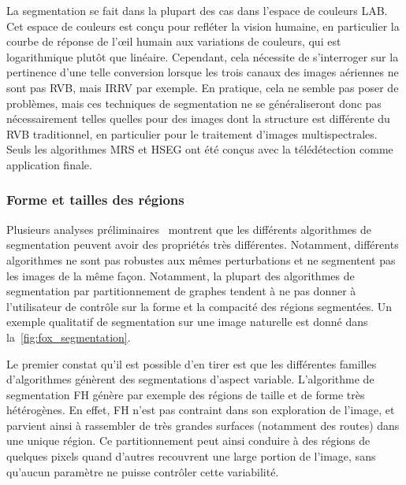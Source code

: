 La segmentation se fait dans la plupart des cas dans l'espace de couleurs \gls{LAB}. Cet espace de couleurs est conçu pour refléter la vision humaine, en particulier la courbe de réponse de l'\oe{}il humain aux variations de couleurs, qui est logarithmique plutôt que linéaire. Cependant, cela nécessite de s'interroger sur la pertinence d'une telle conversion lorsque les trois canaux des images aériennes ne sont pas \gls{RVB}, mais \gls{IRRV} par exemple. En pratique, cela ne semble pas poser de problèmes, mais ces techniques de segmentation ne se généraliseront donc pas nécessairement telles quelles pour des images dont la structure est différente du \gls{RVB} traditionnel, en particulier pour le traitement d'images multispectrales. Seuls les algorithmes \gls{MRS} et \gls{HSEG} ont été conçus avec la télédétection comme application finale.

\subsubsection{Forme et tailles des régions}

Plusieurs analyses préliminaires~\cite{neubert_superpixel_2012,achanta_slic_2012,stutz_superpixels_2018} montrent que les différents algorithmes de segmentation peuvent avoir des propriétés très différentes. Notamment, différents algorithmes ne sont pas robustes aux mêmes perturbations et ne segmentent pas les images de la même façon. Notamment, la plupart des algorithmes de segmentation par partitionnement de graphes tendent à ne pas donner à l'utilisateur de contrôle sur la forme et la compacité des régions segmentées. Un exemple qualitatif de segmentation sur une image naturelle est donné dans la~\cref{fig:fox_segmentation}.

Le premier constat qu'il est possible d'en tirer est que les différentes familles d'algorithmes génèrent des segmentations d'aspect variable. L'algorithme de segmentation \gls{FH} génère par exemple des régions de taille et de forme très hétérogènes. En effet, \gls{FH} n'est pas contraint dans son exploration de l'image, et parvient ainsi à rassembler de très grandes surfaces (notamment des routes) dans une unique région. Ce partitionnement peut ainsi conduire à des régions de quelques pixels quand d'autres recouvrent une large portion de l'image, sans qu'aucun paramètre ne puisse contrôler cette variabilité.

